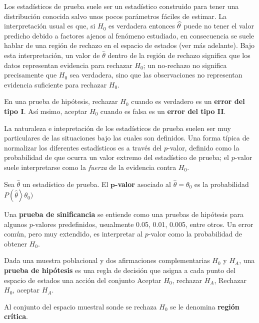 Los estadísticos de prueba suele ser un estadístico construido para tener una distribución conocida salvo unos pocos parámetros fáciles de estimar.
%
La interpretación usual es que, si $H_0$ es verdadera entonces $\widehat{ \theta }$ puede no tener el valor predicho debido a factores ajenos al fenómeno estudiado, en consecuencia se suele hablar de una región de rechazo en el espacio de estados (ver más adelante).
%
Bajo esta interpretación, un valor de $\widehat{\theta}$ dentro de la región de rechazo significa que los datos representan evidencia para rechazar $H_0$; un no-rechazo no significa precisamente que $H_0$ sea verdadera, sino que las observaciones no representan evidencia suficiente para rechazar $H_0$.

\begin{definicion}
En una prueba de hipótesis, rechazar $H_0$ cuando es verdadero es un \textbf{error del tipo I}. Así msimo, aceptar $H_0$ cuando es falsa es un \textbf{error del tipo II}.
\end{definicion}

La naturaleza e intepretación de los estadísticos de prueba suelen ser muy particulares de las situaciones bajo las cuales son definidos.
%
Una forma típica de normalizar los diferentes estadísticos es a través del $p$-valor, definido como la probabilidad de que ocurra un valor extremo del estadístico de prueba; 
el $p$-valor suele interpretarse como la \textit{fuerza} de la evidencia contra $H_0$.

\begin{definicion}
Sea $\widehat{\theta}$ un estadístico de prueba. El \textbf{$\boldsymbol{p}$-valor} asociado al $\widehat{\theta}=\theta_0$ es la probabilidad $P\left(\widehat{\theta}\right>\theta_0)$
\end{definicion}

Una \textbf{prueba de sinificancia} se entiende como una pruebas de hipótesis para algunos $p$-valores predefinidos, usualmente 0.05, 0.01, 0.005, entre otros.
%
Un error común, pero muy extendido, es interpretar al $p$-valor como la probabilidad de obtener $H_0$.

\begin{definicion}
Dada una muestra poblacional y dos afirmaciones complementarias $H_0$ y $H_A$, una \textbf{prueba de hipótesis} es una regla de decisión que asigna a cada punto del espacio de estados una acción del conjunto Aceptar $H_0$, rechazar $H_A$, Rechazar $H_0$, aceptar $H_A$.

Al conjunto del espacio muestral sonde se rechaza $H_0$ se le denomina \textbf{región crítica}. 
\end{definicion}

